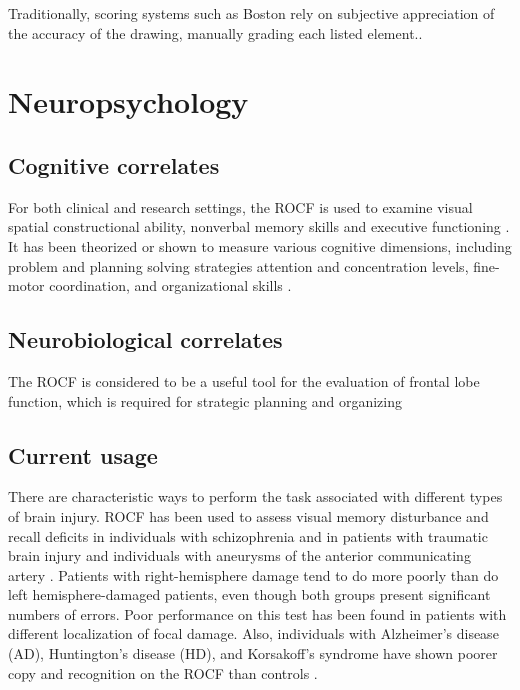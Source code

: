 \documentclass[twocolumn]{article}
\begin{document}
Traditionally, scoring systems such as Boston \cite{8} rely on subjective appreciation of the accuracy of the drawing, manually grading each listed element..  

\section{Neuropsychology}

\subsection{Cognitive correlates}

For both clinical and research settings, the ROCF is used to examine visual spatial constructional ability, nonverbal memory skills and executive functioning \cite{1}. It has been theorized or shown to measure various cognitive dimensions, including problem and planning solving strategies %
\cite{2} attention and concentration levels, fine-motor coordination, and organizational skills \cite{6}.


\subsection{Neurobiological correlates}
The ROCF is considered to be a useful tool for the
evaluation of frontal lobe function, which is required for strategic
planning and organizing \cite{3}


\subsection{Current usage}

There are characteristic ways to perform the task associated with different types of brain injury. 
ROCF has been used to assess visual memory disturbance and recall deficits in individuals with schizophrenia \cite{4, 5} and in patients with traumatic brain injury and individuals with aneurysms of the anterior communicating artery \cite{6}. Patients with right-hemisphere damage tend to do more poorly than do left hemisphere-damaged patients, even though both
groups present significant numbers of errors. Poor performance on this test has been found in patients with different localization of focal damage. Also, individuals with Alzheimer’s disease (AD), Huntington’s disease (HD), and Korsakoff’s syndrome have shown poorer copy and recognition on the ROCF than controls \cite{2}.
\end{document}
